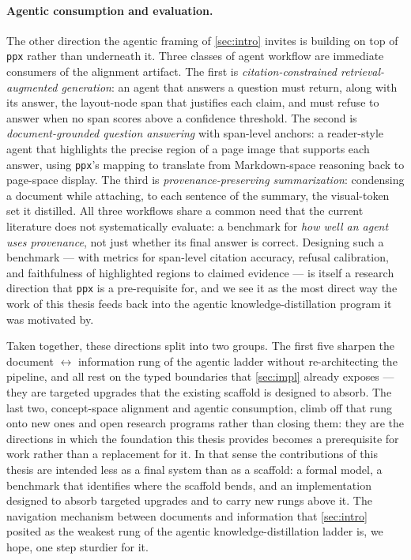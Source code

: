 \documentclass{article}
\theoremstyle{definition}
\begin{document}
\paragraph{Agentic consumption and evaluation.}
The other direction the agentic framing of \cref{sec:intro}
invites is building on top of \texttt{ppx} rather than underneath
it.  Three classes of agent workflow are immediate consumers of the
alignment artifact.  The first is \emph{citation-constrained
      retrieval-augmented generation}: an agent that answers a
question must return, along with its answer, the layout-node span
that justifies each claim, and must refuse to answer when no span
scores above a confidence threshold.  The second is
\emph{document-grounded question answering} with span-level
anchors: a reader-style agent that highlights the precise region
of a page image that supports each answer, using \texttt{ppx}'s
mapping to translate from Markdown-space reasoning back to
page-space display.  The third is \emph{provenance-preserving
      summarization}: condensing a document while attaching, to each
sentence of the summary, the visual-token set it distilled.
All three workflows share a common need that the current
literature does not systematically evaluate: a benchmark for
\emph{how well an agent uses provenance}, not just whether its
final answer is correct.  Designing such a benchmark --- with
metrics for span-level citation accuracy, refusal calibration, and
faithfulness of highlighted regions to claimed evidence --- is
itself a research direction that \texttt{ppx} is a pre-requisite
for, and we see it as the most direct way the work of this thesis
feeds back into the agentic knowledge-distillation program it was
motivated by.

Taken together, these directions split into two groups.  The first
five sharpen the document $\leftrightarrow$ information rung of the
agentic ladder without re-architecting the pipeline, and all rest
on the typed boundaries that \cref{sec:impl} already exposes ---
they are targeted upgrades that the existing scaffold is designed
to absorb.  The last two, concept-space alignment and agentic
consumption, climb off that rung onto new ones and open research
programs rather than closing them: they are the directions in
which the foundation this thesis provides becomes a prerequisite
for work rather than a replacement for it.  In that sense the
contributions of this thesis are intended less as a final system
than as a scaffold: a formal model, a benchmark that identifies
where the scaffold bends, and an implementation designed to absorb
targeted upgrades and to carry new rungs above it.
The navigation mechanism between documents and information that
\cref{sec:intro} posited as the weakest rung of the agentic
knowledge-distillation ladder is, we hope, one step sturdier for it.
\end{document}
